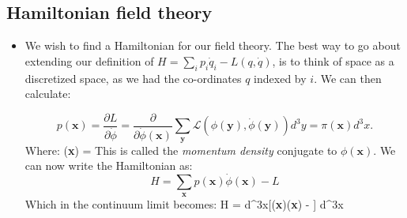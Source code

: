 \documentclass[11pt]{article}
\renewenvironment{flalign}{\vspace{-3mm}\empheq[box=\tcbhighmath]{align}}{\endempheq}
\numberwithin{equation}{section}
\begin{document}
\subsection{Hamiltonian field theory} 
\begin{itemize}
  \item We wish to find a Hamiltonian for our field theory. The best way to go about extending our definition of $H =\sum_i p_i \dot{q}_i  - L(q,\dot{q})$, is to think of space as a discretized space, as we had the co-ordinates $q$ indexed by $i$. We can then calculate:

  \begin{equation*}
  p(\textbf{x}) = \frac{\partial L}{\partial \dot{\phi}} = \frac{\partial }{\partial \dot{\phi}(\textbf{x})}\sum_{\textbf{y}}\mathcal{L}(\phi(\textbf{y}),\dot{\phi}(\textbf{y}))d^3y = \pi(\textbf{x})d^3x. 
  \end{equation*}
  Where:
  \begin{flalign}
  \label{pi}
  \pi(\textbf{x}) = 
  \end{flalign}
  This is called the \emph{momentum density} conjugate to $\phi(\textbf{x})$. We can now write the Hamiltonian as:
  \begin{equation*}
    H = \sum_{\textbf{x}}p(\textbf{x})\dot{\phi}(\textbf{x}) - L
  \end{equation*}
  Which in the continuum limit becomes:
  \begin{flalign}
\label{Hamiltonian}
     H = \int d^3x[\pi(\textbf{x})\dot{\phi}(\textbf{x}) - ] \equiv \int d^3x 
   \end{flalign} 
\end{itemize}
\end{document}
